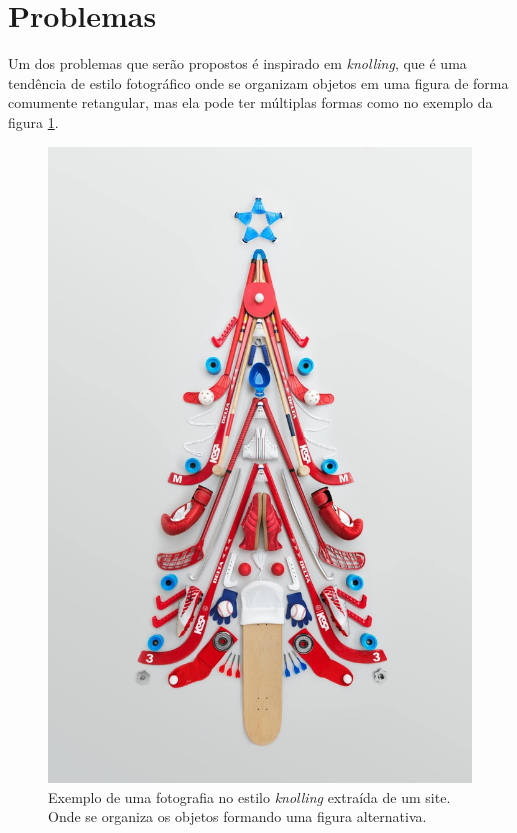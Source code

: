 \section{Problemas}\label{cap:introducao:sec:problema}
Um dos problemas que serão propostos é inspirado em \textit{knolling}, que é uma tendência de estilo fotográfico onde se organizam objetos em uma figura de forma comumente retangular, mas ela pode ter múltiplas formas como no exemplo da figura \ref{fig:Cap01_Knolling_Photography_43}.
\begin{figure}[H]
    \centering
    \includegraphics[scale=0.2]{Capitulos/Cap01_figs/Knolling-Photography-43.jpg}
    \caption{Exemplo de uma fotografia no estilo \textit{knolling} extraída de um site\cite{knolling:blog}. Onde se organiza os objetos formando uma figura alternativa.}
    \label{fig:Cap01_Knolling_Photography_43}
\end{figure}
